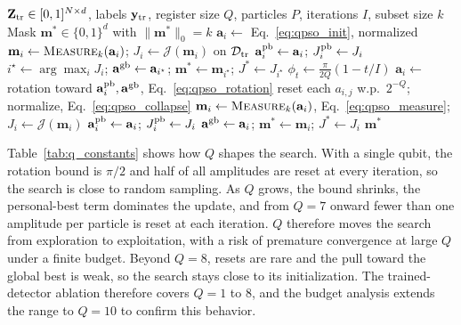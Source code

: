 \documentclass[conference]{IEEEtran}
\begin{document}
\begin{algorithm}[!t]
\caption{Variable-qubit QPSO feature
selection. Steps commented with Q are the only ones that depend on
the register size.}
\label{alg:qpso}
\small
\begin{algorithmic}[1]
\Require $\mathbf{Z}_{\rm tr}\in[0,1]^{N\times d}$, labels $\mathbf{y}_{\rm tr}$, register size $Q$, particles $P$, iterations $I$, subset size $k$
\Ensure Mask $\mathbf{m}^{*}\in\{0,1\}^{d}$ with $\|\mathbf{m}^{*}\|_0=k$
  \State $\mathbf{a}_i\gets$ Eq.~\eqref{eq:qpso_init}, normalized 
  \State $\mathbf{m}_i\gets\textsc{Measure}_k(\mathbf{a}_i)$; $J_i\gets\mathcal{J}(\mathbf{m}_i)$ on $\mathcal{D}_{\rm tr}$
  \State $\mathbf{a}_i^{\rm pb}\gets\mathbf{a}_i$; $J_i^{\rm pb}\gets J_i$
\EndFor
\State $i^{\star}\gets\arg\max_i J_i$; $\mathbf{a}^{\rm gb}\gets\mathbf{a}_{i^{\star}}$; $\mathbf{m}^{*}\gets\mathbf{m}_{i^{\star}}$; $J^{*}\gets J_{i^{\star}}$
  \State $\phi_t\gets\frac{\pi}{2Q}(1-t/I)$ 
    \State $\mathbf{a}_i\gets$ rotation toward $\mathbf{a}_i^{\rm pb},\mathbf{a}^{\rm gb}$, Eq.~\eqref{eq:qpso_rotation}
    \State reset each $a_{i,j}$ w.p.\ $2^{-Q}$; normalize, Eq.~\eqref{eq:qpso_collapse} 
    \State $\mathbf{m}_i\gets\textsc{Measure}_k(\mathbf{a}_i)$, Eq.~\eqref{eq:qpso_measure}; $J_i\gets\mathcal{J}(\mathbf{m}_i)$
      \State $\mathbf{a}_i^{\rm pb}\gets\mathbf{a}_i$; $J_i^{\rm pb}\gets J_i$
    \EndIf
      \State $\mathbf{a}^{\rm gb}\gets\mathbf{a}_i$; $\mathbf{m}^{*}\gets\mathbf{m}_i$; $J^{*}\gets J_i$
    \EndIf
  \EndFor
\EndFor
\State \Return $\mathbf{m}^{*}$ 
\end{algorithmic}
\end{algorithm}

Table~\ref{tab:q_constants} shows
how $Q$ shapes the search. With a single qubit, the rotation bound is
$\pi/2$ and half of all amplitudes are reset at every iteration, so
the search is close to random sampling. As $Q$ grows, the bound
shrinks, the personal-best term dominates the update, and from $Q=7$
onward fewer than one amplitude per particle is reset at each
iteration. $Q$ therefore
moves the search from exploration to exploitation, with a risk of
premature convergence at large $Q$ under a finite budget. Beyond
$Q=8$, resets are rare and the pull toward the global best is weak,
so the search stays close to its initialization. The trained-detector
ablation therefore covers $Q=1$ to $8$, and the budget analysis
extends the range to $Q=10$ to confirm this behavior.
\end{document}
